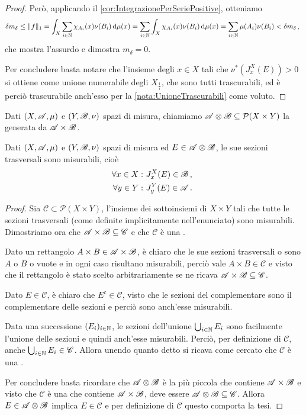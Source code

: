 \begin{proof}
	Però, applicando il \cref{cor:IntegrazionePerSeriePositive}, otteniamo
	\begin{equation*}
		\delta m_\delta \le\Vert f\Vert_1=\int_X \sum_{i\in\mathbb N}\chi_{A_i}(x)\nu(B_i)\,\mathrm d\mu(x)= \sum_{i\in\mathbb N}\int_X \chi_{A_i}(x)\nu(B_i)\,\mathrm d\mu(x)=\sum_{i\in\mathbb N}\mu(A_i)\nu(B_i)<\delta m_\delta\, \text{, }
	\end{equation*}
	che mostra l'assurdo e dimostra $m_\delta=0$.
	
	Per concludere basta notare che l'insieme degli $x\in X$ tali che $\nu^*(J_x^X(E))>0$ si ottiene come unione numerabile degli $X_{\frac 1i}$, che sono tutti trascurabili, ed è perciò trascurabile anch'esso per la \cref{nota:UnioneTrascurabili} come voluto.
\end{proof}

\begin{definition}\label{def:SigAlgProdotto}
	Dati $(X,\mathscr A,\mu)$ e $(Y,\mathscr B,\nu)$ spazi di misura, chiamiamo $\mathscr A\otimes\mathscr B\subseteq \mathcal P(X\times Y)$ la \sigalg{} generata da $\mathscr A\times\mathscr B$. 
\end{definition}

\begin{proposition}\label{prop:SezioniMisurabili}
	Dati $(X,\mathscr A,\mu)$ e $(Y,\mathscr B,\nu)$ spazi di misura ed $E\in\mathscr A\otimes\mathscr B$, le sue sezioni trasversali sono misurabili, cioè
	\begin{align*}
		\forall x\in X:\ &J^X_x(E)\in\mathscr B \, \text{, } \\
		\forall y\in Y:\ &J^Y_y(E)\in\mathscr A \, \text{. }
	\end{align*}
\end{proposition}
\begin{proof}
	\newcommand{\C}{\ensuremath{\mathscr C}}
	Sia $\C\subset\mathcal P(X\times Y)$, l'insieme dei sottoinsiemi di $X\times Y$ tali che tutte le sezioni trasversali (come definite implicitamente nell'enunciato) sono misurabili.
	Dimostriamo ora che $\A\times\B\subseteq \C$ e che $\C$ è una \sigalg{}.
	
	Dato un rettangolo $A\times B\in\mathscr A\times\mathscr B$, è chiaro che le sue sezioni trasversali o sono $A$ o $B$ o vuote e in ogni caso risultano misurabili, perciò vale $A\times B\in\C$ e visto che il rettangolo è stato scelto arbitrariamente se ne ricava $\A\times\B\subseteq \C$.
	
	Dato $E\in\C$, è chiaro che $E^\mathsf{c}\in\C$, visto che le sezioni del complementare sono il complementare delle sezioni e perciò sono anch'esse misurabili.
	
	Data una successione $(E_i)_{i\in\mathbb N}$, le sezioni dell'unione $\bigcup_{i\in\mathbb N}E_i$ sono facilmente l'unione delle sezioni e quindi anch'esse misurabili. Perciò, per definizione di $\C$, anche $\bigcup_{i\in\N}E_i\in\C$.
	Allora unendo quanto detto si ricava come cercato che $\C$ è una \sigalg{}.
	
	Per concludere basta ricordare che $\mathscr A\otimes\mathscr B$ è la più piccola \sigalg{} che contiene $\mathscr A\times\mathscr B$ e visto che $\C$ è una \sigalg{} che contiene $\mathscr A\times\mathscr B$, deve essere $\A\otimes\B\subseteq\C$. Allora $E\in\mathscr A\otimes\mathscr B$ implica $E\in\C$ e per definizione di $\C$ questo comporta la tesi.
\end{proof}

